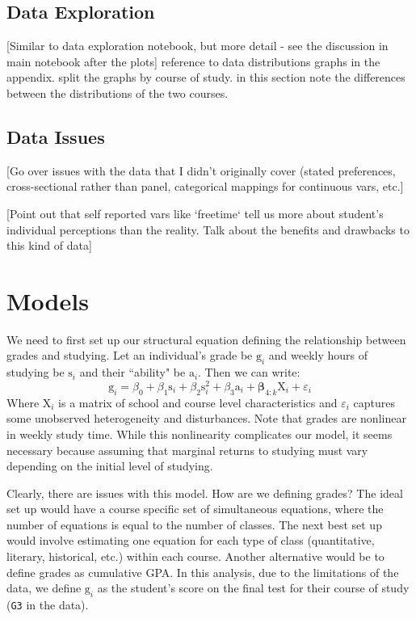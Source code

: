 \documentclass[12pt]{article}
\newcommand{\inlinecode}{\texttt}
\begin{document}
\subsection{Data Exploration}
\textcolor{BrickRed}{[Similar to data exploration notebook, but more detail - see the discussion in main notebook after the plots]}
reference to data distributions graphs in the appendix. split the graphs by course of study. in this section note the differences between the distributions of the two courses.

\subsection{Data Issues}
\textcolor{BrickRed}{[Go over issues with the data that I didn't originally cover (stated preferences, cross-sectional rather than panel, categorical mappings for continuous vars, etc.]}

\textcolor{BrickRed}{[Point out that self reported vars like `freetime` tell us more about student's individual perceptions than the reality. Talk about the benefits and drawbacks to this kind of data]}


\newpage
\section{Models}
We need to first set up our structural equation defining the relationship between grades and studying. Let an individual's grade be $\mathrm{g}_i$ and weekly hours of studying be $\mathrm{s}_i$ and their ``ability" be $\mathrm{a}_i$. Then we can write:
$$
\mathrm{g}_i = \beta_0 + \beta_1 \mathrm{s}_i + \beta_2 \mathrm{s}_i^2  + \beta_3 \mathrm{a}_i + \boldsymbol{\beta}_{4:k}\mathrm{X}_i + \varepsilon_i
$$
Where X$_i$ is a matrix of school and course level characteristics and $\varepsilon_i$ captures some unobserved heterogeneity and disturbances. Note that grades are nonlinear in weekly study time. While this nonlinearity complicates our model, it seems necessary because assuming that marginal returns to studying must vary depending on the initial level of studying.

Clearly, there are issues with this model. How are we defining grades? The ideal set up would have a course specific set of simultaneous equations, where the number of equations is equal to the number of classes. The next best set up would involve estimating one equation for each type of class (quantitative, literary, historical, etc.) within each course. Another alternative would be to define grades as cumulative GPA. In this analysis, due to the limitations of the data, we define $\mathrm{g}_i$ as the student's score on the final test for their course of study (\inlinecode{G3} in the data).
\end{document}
